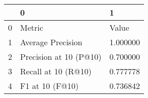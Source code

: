 \begin{tabular}{lll}
\toprule
 & 0 & 1 \\
\midrule
0 & Metric & Value \\
1 & Average Precision & 1.000000 \\
2 & Precision at 10 (P@10) & 0.700000 \\
3 & Recall at 10 (R@10) & 0.777778 \\
4 & F1 at 10 (F@10) & 0.736842 \\
\bottomrule
\end{tabular}
